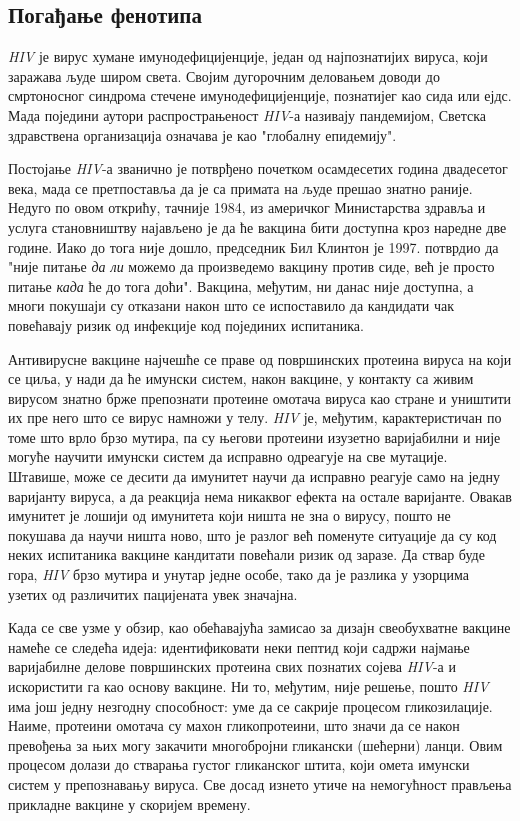 \documentclass[12pt,oneside]{memoir}
\begin{document}
\begin{CJK}{UTF8}{ipxm}
\section{Погађање фенотипа}
\textit{HIV} је вирус хумане имунодефицијенције, један од најпознатијих вируса, који заражава људе широм света. Својим дугорочним деловањем доводи до смртоносног синдрома стечене имунодефицијенције, познатијег као сида или ејдс. Мада поједини аутори распрострањеност \textit{HIV}-а називају пандемијом, Светска здравствена организација означава је као "глобалну епидемију"\cite{who}.

Постојање \textit{HIV}-а званично је потврђено почетком осамдесетих година двадесетог века, мада се претпоставља да је са примата на људе прешао знатно раније. Недуго по овом открићу, тачније 1984, из америчког Министарства здравља и услуга становништву најављено је да ће вакцина бити доступна кроз наредне две године. Иако до тога није дошло, председник Бил Клинтон је 1997. потврдио да "није питање \textit{да ли} можемо да произведемо вакцину против сиде, већ је просто питање \textit{када} ће до тога доћи". Вакцина, међутим, ни данас није доступна, а многи покушаји су отказани након што се испоставило да кандидати чак повећавају ризик од инфекције код појединих испитаника.

Антивирусне вакцине најчешће се праве од површинских протеина вируса на који се циља, у нади да ће имунски систем, након вакцине, у контакту са живим вирусом знатно брже препознати протеине омотача вируса као стране и уништити их пре него што се вирус намножи у телу. \textit{HIV} је, међутим, карактеристичан по томе што врло брзо мутира, па су његови протеини изузетно варијабилни и није могуће научити имунски систем да исправно одреагује на све мутације. Штавише, може се десити да имунитет научи да исправно реагује само на једну варијанту вируса, а да реакција нема никаквог ефекта на остале варијанте. Овакав имунитет је лошији од имунитета који ништа не зна о вирусу, пошто не покушава да научи ништа ново, што је разлог већ поменуте ситуације да су код неких испитаника вакцине кандитати повећали ризик од заразе. Да ствар буде гора, \textit{HIV} брзо мутира и унутар једне особе, тако да је разлика у узорцима узетих од различитих пацијената увек значајна.

Када се све узме у обзир, као обећавајућа замисао за дизајн свеобухватне вакцине намеће се следећа идеја: идентификовати неки пептид који садржи најмање варијабилне делове површинских протеина свих познатих сојева \textit{HIV}-а и искористити га као основу вакцине. Ни то, међутим, није решење, пошто \textit{HIV} има још једну незгодну способност: уме да се сакрије процесом гликозилације. Наиме, протеини омотача су махон гликопротеини, што значи да се након превођења за њих могу закачити многобројни гликански (шећерни) ланци. Овим процесом долази до стварања густог гликанског штита, који омета имунски систем у препознавању вируса. Све досад изнето утиче на немогућност прављења прикладне вакцине у скоријем времену.


\end{CJK}
\end{document}
